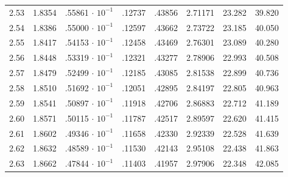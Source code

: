 \begin{minipage}{0.435\textwidth}
{\begin{tabular}{c|c|c|c|c|c|c|c}
        2.53 & 1.8354 & .55861$\,\cdot\,10^{-1}$ & .12737 & .43856 & 2.71171 & 23.282 & 39.820 \\
        2.54 & 1.8386 & .55000$\,\cdot\,10^{-1}$ & .12597 & .43662 & 2.73722 & 23.185 & 40.050 \\
        2.55 & 1.8417 & .54153$\,\cdot\,10^{-1}$ & .12458 & .43469 & 2.76301 & 23.089 & 40.280 \\
        2.56 & 1.8448 & .53319$\,\cdot\,10^{-1}$ & .12321 & .43277 & 2.78906 & 22.993 & 40.508 \\
        2.57 & 1.8479 & .52499$\,\cdot\,10^{-1}$ & .12185 & .43085 & 2.81538 & 22.899 & 40.736 \\
        2.58 & 1.8510 & .51692$\,\cdot\,10^{-1}$ & .12051 & .42895 & 2.84197 & 22.805 & 40.963 \\
        2.59 & 1.8541 & .50897$\,\cdot\,10^{-1}$ & .11918 & .42706 & 2.86883 & 22.712 & 41.189 \\
        2.60 & 1.8571 & .50115$\,\cdot\,10^{-1}$ & .11787 & .42517 & 2.89597 & 22.620 & 41.415 \\
        2.61 & 1.8602 & .49346$\,\cdot\,10^{-1}$ & .11658 & .42330 & 2.92339 & 22.528 & 41.639 \\
        2.62 & 1.8632 & .48589$\,\cdot\,10^{-1}$ & .11530 & .42143 & 2.95108 & 22.438 & 41.863 \\
        2.63 & 1.8662 & .47844$\,\cdot\,10^{-1}$ & .11403 & .41957 & 2.97906 & 22.348 & 42.085
    \end{tabular}
    }
\end{minipage}%
\vline
